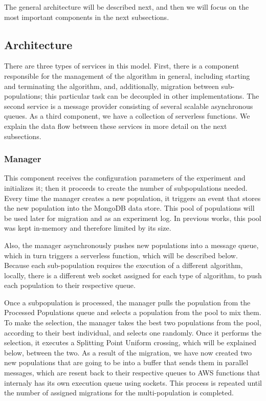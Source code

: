 \documentclass[runningheads]{llncs}
\begin{document}
The general architecture will be described next, and then we will
focus on the most important components in the next subsections.

\subsection{Architecture}

There are three types of services in this model. First, there is a component
responsible for the management of the algorithm in general, including
starting and terminating the algorithm, and, additionally, migration between sub-populations; this
particular task can be decoupled in other implementations. The second service is
a message provider consisting of several scalable asynchronous queues. As a
third component, we have a collection of serverless functions. We explain the 
data flow between these services in more detail on the next subsections.  

\subsubsection{Manager}

This component receives the configuration parameters of
  the experiment and initializes it; then it proceeds to create the
  number of subpopulations needed. Every time the manager creates a new
  population, it triggers an event that stores the new population into the
  MongoDB data store. This pool of populations will be used later for migration
  and as an experiment log. In previous works, this pool was kept in-memory and
  therefore limited by its size. 

  Also, the manager asynchronously pushes new populations into a message queue,
  which in turn triggers a serverless function, which will be
  described below. Because each sub-population
  requires the execution of a different algorithm, locally, there is a different
  web socket assigned for each type of algorithm, to push each population to
  their respective queue.

 Once a subpopulation is processed, the manager pulls
  the population from the Processed Populations queue and selects a population
  from the pool to mix them. To make the selection, the manager takes the best
  two populations from the pool, according to their best individual, and selects
  one randomly. Once it performs the selection, it executes a Splitting Point
  Uniform crossing, which will be explained below, between the two. As a result of the migration, we have now created two new
  populations that are going to be into a buffer that sends them in
  parallel messages, which are resent back to their respective queues  to AWS functions that internaly has 
  its own execution queue using sockets. This process is
  repeated until the number of assigned migrations for the
  multi-population \cite{Ma2019,Santander-jim2018} is completed.
\end{document}
